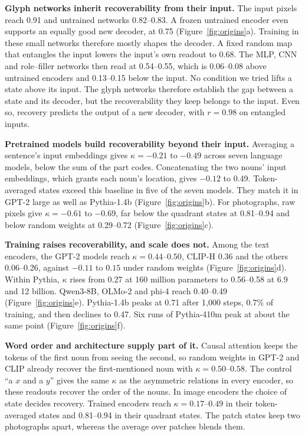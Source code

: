 \textbf{Glyph networks inherit recoverability from their input.} The input pixels reach 0.91 and untrained networks 0.82--0.83. A frozen untrained encoder even supports an equally good new decoder, at 0.75 (Figure~\ref{fig:origins}a). Training in these small networks therefore mostly shapes the decoder. A fixed random map that entangles the input lowers the input's own readout to 0.68. The MLP, CNN and role--filler networks then read at 0.54--0.55, which is 0.06--0.08 above untrained encoders and 0.13--0.15 below the input. No condition we tried lifts a state above its input. The glyph networks therefore establish the gap between a state and its decoder, but the recoverability they keep belongs to the input. Even so, recovery predicts the output of a new decoder, with $r = 0.98$ on entangled inputs.

\textbf{Pretrained models build recoverability beyond their input.} Averaging a sentence's input embeddings gives $\kappa = -0.21$ to $-0.49$ across seven language models, below the sum of the part codes. Concatenating the two nouns' input embeddings, which grants each noun's location, gives $-0.12$ to 0.49. Token-averaged states exceed this baseline in five of the seven models. They match it in GPT-2 large as well as Pythia-1.4b (Figure~\ref{fig:origins}b). For photographs, raw pixels give $\kappa = -0.61$ to $-0.69$, far below the quadrant states at 0.81--0.94 and below random weights at 0.29--0.72 (Figure~\ref{fig:origins}c).

\textbf{Training raises recoverability, and scale does not.} Among the text encoders, the GPT-2 models reach $\kappa = 0.44$--$0.50$, CLIP-H 0.36 and the others 0.06--0.26, against $-0.11$ to $0.15$ under random weights (Figure~\ref{fig:origins}d). Within Pythia, $\kappa$ rises from 0.27 at 160 million parameters to 0.56--0.58 at 6.9 and 12 billion. Qwen3-8B, OLMo-2 and phi-4 reach 0.40--0.49 (Figure~\ref{fig:origins}e). Pythia-1.4b peaks at 0.71 after 1{,}000 steps, 0.7\% of training, and then declines to 0.47. Six runs of Pythia-410m peak at about the same point (Figure~\ref{fig:origins}f).

\textbf{Word order and architecture supply part of it.} Causal attention keeps the tokens of the first noun from seeing the second, so random weights in GPT-2 and CLIP already recover the first-mentioned noun with $\kappa = 0.50$--$0.58$. The control ``a $x$ and a $y$'' gives the same $\kappa$ as the asymmetric relations in every encoder, so these readouts recover the order of the nouns. In image encoders the choice of state decides recovery. Trained encoders reach $\kappa = 0.17$--$0.49$ in their token-averaged states and 0.81--0.94 in their quadrant states. The patch states keep two photographs apart, whereas the average over patches blends them.

